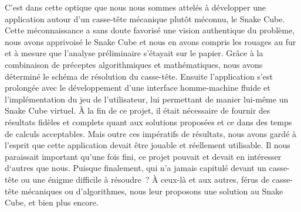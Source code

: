 C’est dans cette optique que nous nous sommes attelés à développer une application autour d’un casse-tête mécanique plutôt méconnu, le Snake Cube. Cette méconnaissance a sans doute favorisé une vision authentique du problème, nous avons apprivoisé le Snake Cube et nous en avons compris les rouages au fur et à mesure que l’analyse préliminaire s’étayait sur le papier. Grâce à la combinaison de préceptes algorithmiques et mathématiques, nous avons déterminé le schéma de résolution du casse-tête. Ensuite l’application s’est prolongée avec le développement d’une interface homme-machine fluide et l’implémentation du jeu de l’utilisateur, lui permettant de manier lui-même un Snake Cube virtuel. À la fin de ce projet, il était nécessaire de fournir des résultats fidèles et complets quant aux solutions proposées et ce dans des temps de calculs acceptables. Mais outre ces impératifs de résultats, nous avons gardé à l’esprit que cette application devait être jouable et réellement utilisable. Il nous paraissait important qu’une fois fini, ce projet pouvait et devait en intéresser d‘autres que nous. Puisque finalement, qui n’a jamais capitulé devant un casse-tête ou une énigme difficile à résoudre ? À ceux-là et aux autres, férus de casse-tête mécaniques ou d’algorithmes, nous leur proposons une solution au Snake Cube, et bien plus encore. \newline       
	
